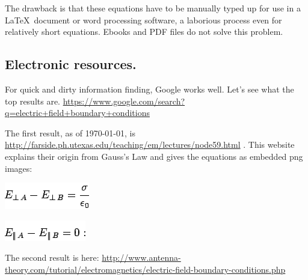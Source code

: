 \documentclass[12pt,letterpaper]{article}
\begin{document}
The drawback is that these equations have to be manually typed up for use in a \LaTeX\ document or word processing software, a laborious process even for relatively short equations. Ebooks and PDF files do not solve this problem.

\subsection{Electronic resources.}

For quick and dirty information finding, Google works well. Let's see what the top results are.
\url{https://www.google.com/search?q=electric+field+boundary+conditions}

The first result, as of \today, is
\url{http://farside.ph.utexas.edu/teaching/em/lectures/node59.html}
. This website explains their origin from Gauss's Law and gives the equations as embedded png images:

\begin{center}
\includegraphics[scale=0.5]{img1337.png}

\includegraphics[scale=0.5]{img1344.png}
\end{center}

The second result is here: \url{http://www.antenna-theory.com/tutorial/electromagnetics/electric-field-boundary-conditions.php}
\end{document}
